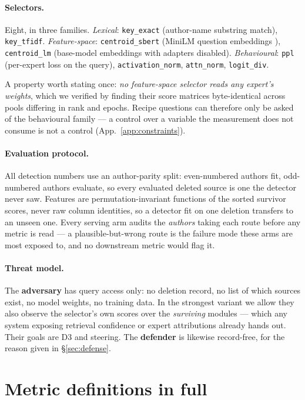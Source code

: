 \documentclass{article}
\begin{document}
\paragraph{Selectors.} Eight, in three families. \emph{Lexical}: \texttt{key\_exact} (author-name
substring match), \texttt{key\_tfidf}. \emph{Feature-space}: \texttt{centroid\_sbert} (MiniLM
question embeddings \citep{reimers2019sbert}), \texttt{centroid\_lm} (base-model embeddings with
adapters disabled). \emph{Behavioural}: \texttt{ppl} (per-expert loss on the query),
\texttt{activation\_norm}, \texttt{attn\_norm}, \texttt{logit\_div}.

A property worth stating once: \emph{no feature-space selector reads any expert's weights}, which
we verified by finding their score matrices byte-identical across pools differing in rank and
epochs. Recipe questions can therefore only be asked of the behavioural family --- a control over a
variable the measurement does not consume is not a control (App.~\ref{app:constraints}).

\paragraph{Evaluation protocol.} All detection numbers use an author-parity split: even-numbered
authors fit, odd-numbered authors evaluate, so every evaluated deleted source is one the detector
never saw. Features are permutation-invariant functions of the sorted survivor scores, never raw
column identities, so a detector fit on one deletion transfers to an unseen one. Every serving arm
audits the \emph{authors} taking each route before any metric is read --- a plausible-but-wrong
route is the failure mode these arms are most exposed to, and no downstream metric would flag it.

\paragraph{Threat model.} The \textbf{adversary} has query access only: no deletion record, no list
of which sources exist, no model weights, no training data. In the strongest variant we allow they
also observe the selector's own scores over the \emph{surviving} modules --- which any system
exposing retrieval confidence or expert attributions already hands out. Their goals are D3 and
steering. The \textbf{defender} is likewise record-free, for the reason given in
\S\ref{sec:defense}.

\section{Metric definitions in full}
\label{app:metrics}
\end{document}
